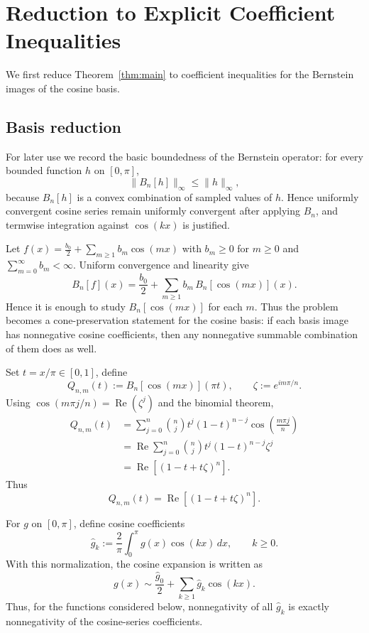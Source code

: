 \documentclass[10pt,a4paper]{amsart}
\DeclareMathOperator{\RealPart}{Re}
\renewcommand{\Re}{\RealPart}
\begin{document}
\section{Reduction to Explicit Coefficient Inequalities}
We first reduce Theorem~\ref{thm:main} to coefficient inequalities for the
Bernstein images of the cosine basis.


\subsection{Basis reduction}
For later use we record the basic boundedness of the Bernstein operator: for every bounded function $h$ on $[0,\pi]$,
\[
\|B_n[h]\|_\infty\le \|h\|_\infty,
\]
because $B_n[h]$ is a convex combination of sampled values of $h$. Hence uniformly convergent cosine series remain uniformly convergent after applying $B_n$, and termwise integration against $\cos(kx)$ is justified.

Let $f(x)=\frac{b_0}{2} + \sum_{m\ge1} b_m\cos(mx)$ with $b_m\ge0$ for $m \geq 0$ and $\sum_{m = 0}^\infty b_m<\infty$. Uniform convergence and linearity give
\[
  B_n[f](x)=\frac{b_0}{2}+\sum_{m\ge1}b_m\,B_n[\cos(mx)](x).
\]
Hence it is enough to study $B_n[\cos(mx)]$ for each $m$. Thus the problem becomes a cone-preservation statement for the cosine basis: if each basis image has nonnegative cosine coefficients, then any nonnegative summable combination of them does as well.

Set $t=x/\pi\in[0,1]$, define
\[
Q_{n,m}(t):=B_n[\cos(mx)](\pi t),\qquad \zeta:=e^{im\pi/n}.
\]
Using $\cos(m\pi j/n)=\Re(\zeta^j)$ and the binomial theorem,
\[
\begin{aligned}
Q_{n,m}(t)
&=\sum_{j=0}^{n}\binom{n}{j}t^j(1-t)^{n-j}
\cos\!\left(\frac{m\pi j}{n}\right) \\
&=\Re\sum_{j=0}^{n}\binom{n}{j}t^j(1-t)^{n-j}\zeta^j \\
&=\Re[(1-t+t\zeta)^n].
\end{aligned}
\]
Thus
\begin{equation}
\label{eq:Qclosed}
Q_{n,m}(t)=\Re[(1-t+t\zeta)^n].
\end{equation}

For $g$ on $[0,\pi]$, define cosine coefficients
\[
\widehat g_k:=\frac{2}{\pi}\int_0^\pi g(x)\cos(kx)\,dx,\qquad k\ge0.
\]
With this normalization, the cosine expansion is written as
\[
g(x) \sim \frac{\widehat g_0}{2} + \sum_{k\ge1}\widehat g_k\cos(kx).
\]
Thus, for the functions considered below, nonnegativity of all $\widehat g_k$ is exactly nonnegativity of the cosine-series coefficients.
\end{document}
